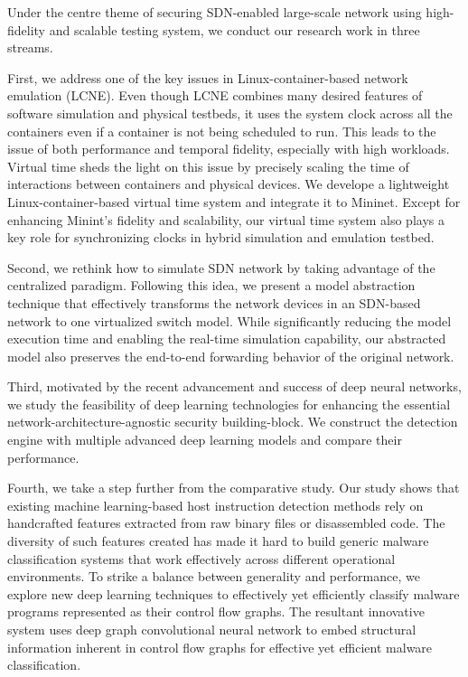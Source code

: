 
Under the centre theme of securing SDN-enabled large-scale network using high-fidelity and scalable testing system, we conduct our research work in three streams.

First, we address one of the key issues in Linux-container-based network emulation (LCNE).
Even though LCNE combines many desired features of software simulation and physical testbeds,
it uses the system clock across all the containers even if a container is not being scheduled to run.
This leads to the issue of both performance and temporal fidelity, especially with high workloads.
Virtual time sheds the light on this issue by precisely scaling the time of interactions between containers and physical devices.
We develope a lightweight Linux-container-based virtual time system and integrate it to Mininet.
Except for enhancing Minint's fidelity and scalability,
our virtual time system also plays a key role for synchronizing clocks in hybrid simulation and emulation testbed.

Second, we rethink how to simulate SDN network by taking advantage of the centralized paradigm.
Following this idea, we present a model abstraction technique that effectively transforms
the network devices in an SDN-based network to one virtualized switch model.
While significantly reducing the model execution time and enabling the real-time simulation capability,
our abstracted model also preserves the end-to-end forwarding behavior of the original network.

Third, motivated by the recent advancement and success of deep neural networks,
we study the feasibility of deep learning technologies for enhancing the essential network-architecture-agnostic security building-block.
We construct the detection engine with multiple advanced deep learning models and compare their performance.

Fourth, we take a step further from the comparative study.
Our study shows that existing machine learning-based host instruction detection methods rely on handcrafted features extracted from raw binary files or disassembled code.
The diversity of such features created has made it hard to build generic malware classification systems that
work effectively across different operational environments.
To strike a balance between generality and performance,
we explore new deep learning techniques to effectively yet efficiently classify malware programs represented as their control flow graphs.
The resultant innovative system uses deep graph convolutional neural network to
embed structural information inherent in control flow graphs for effective yet efficient malware classification.


